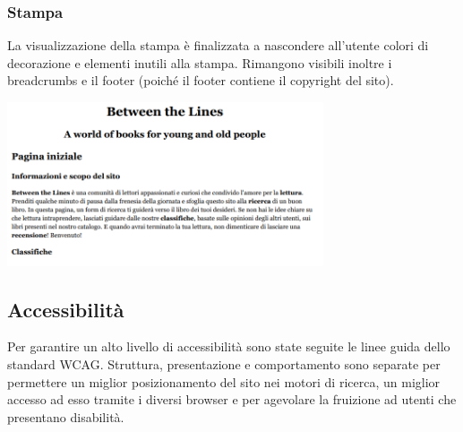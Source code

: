 \documentclass[12pt,a4paper,headings=optiontohead]{article}
\begin{document}
	\subsubsection{Stampa}
	La visualizzazione della stampa è finalizzata a nascondere all'utente colori di decorazione e elementi inutili alla stampa. Rimangono visibili inoltre i breadcrumbs e il footer (poiché il footer contiene il copyright del sito).
	\begin{center}
		\includegraphics[width=0.7\textwidth]{../img/layout_relazione/stampa.png}
	\end{center}
	
	\subsection{Accessibilità}
	Per garantire un alto livello di accessibilità sono state seguite le linee guida dello standard WCAG. Struttura, presentazione e comportamento sono separate per permettere un miglior posizionamento del sito nei motori di ricerca, un miglior accesso ad esso tramite i diversi browser e per agevolare la fruizione ad utenti che presentano disabilità.
	
\end{document}
